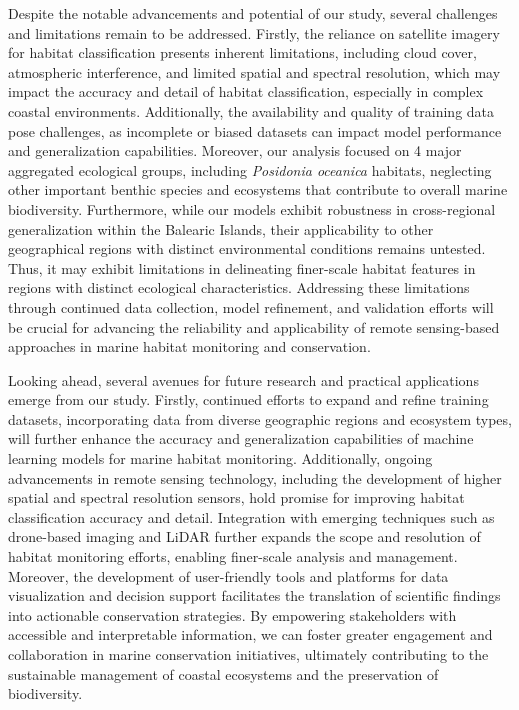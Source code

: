 Despite the notable advancements and potential of our study, several challenges
and limitations remain to be addressed. Firstly, the reliance on satellite
imagery for habitat classification presents inherent limitations, including
cloud cover, atmospheric interference, and limited spatial and spectral
resolution, which may impact the accuracy and detail of habitat classification,
especially in complex coastal environments. Additionally, the availability and
quality of training data pose challenges, as incomplete or biased datasets can
impact model performance and generalization capabilities. Moreover, our
analysis focused on 4 major aggregated ecological groups, including
\textit{Posidonia oceanica} habitats, neglecting other important benthic
species and ecosystems that contribute to overall marine biodiversity.
Furthermore, while our models exhibit robustness in cross-regional
generalization within the Balearic Islands, their applicability to other
geographical regions with distinct environmental conditions remains untested.
Thus, it may exhibit limitations in delineating finer-scale habitat features in
regions with distinct ecological characteristics. Addressing these limitations
through continued data collection, model refinement, and validation efforts
will be crucial for advancing the reliability and applicability of remote
sensing-based approaches in marine habitat monitoring and conservation.

Looking ahead, several avenues for future research and practical applications
emerge from our study. Firstly, continued efforts to expand and refine training
datasets, incorporating data from diverse geographic regions and ecosystem
types, will further enhance the accuracy and generalization capabilities of
machine learning models for marine habitat monitoring. Additionally, ongoing
advancements in remote sensing technology, including the development of higher
spatial and spectral resolution sensors, hold promise for improving habitat
classification accuracy and detail. Integration with emerging techniques such
as drone-based imaging and LiDAR further expands the scope and resolution of
habitat monitoring efforts, enabling finer-scale analysis and management.
Moreover, the development of user-friendly tools and platforms for data
visualization and decision support facilitates the translation of scientific
findings into actionable conservation strategies. By empowering stakeholders
with accessible and interpretable information, we can foster greater engagement
and collaboration in marine conservation initiatives, ultimately contributing
to the sustainable management of coastal ecosystems and the preservation of
biodiversity.

